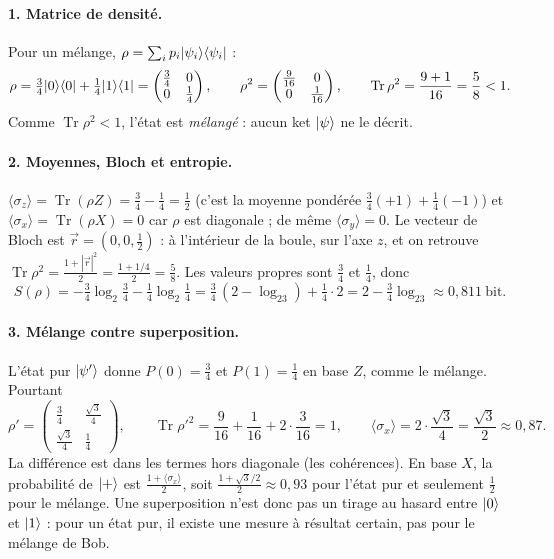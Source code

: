 \begin{correction}
\paragraph{1. Matrice de densité.} Pour un mélange, $\rho=\sum_ip_i|\psi_i\rangle\langle \psi_i|$ :
\[
  \rho=\tfrac34|0\rangle\langle 0|+\tfrac14|1\rangle\langle 1|
  =\begin{pmatrix}\frac34&0\\0&\frac14\end{pmatrix},
  \qquad
  \rho^2=\begin{pmatrix}\frac9{16}&0\\0&\frac1{16}\end{pmatrix},
  \qquad
  \operatorname{Tr}\rho^2=\frac{9+1}{16}=\frac58<1 .
\]
Comme $\operatorname{Tr}\rho^2<1$, l'état est \emph{mélangé} : aucun ket $|\psi\rangle$ ne le décrit.

\paragraph{2. Moyennes, Bloch et entropie.}
$\langle\sigma_z\rangle=\operatorname{Tr}(\rho Z)=\frac34-\frac14=\frac12$ (c'est la moyenne pondérée
$\frac34(+1)+\frac14(-1)$) et $\langle\sigma_x\rangle=\operatorname{Tr}(\rho X)=0$ car $\rho$ est
diagonale ; de même $\langle\sigma_y\rangle=0$. Le vecteur de Bloch est $\vec r=(0,0,\frac12)$ : à
l'intérieur de la boule, sur l'axe $z$, et on retrouve $\operatorname{Tr}\rho^2=\frac{1+|\vec r|^2}{2}
=\frac{1+1/4}{2}=\frac58$. Les valeurs propres sont $\frac34$ et $\frac14$, donc
\[
  S(\rho)=-\tfrac34\log_2\tfrac34-\tfrac14\log_2\tfrac14
  =\tfrac34\,(2-\log_23)+\tfrac14\cdot2=2-\tfrac34\log_23\approx0{,}811\ \text{bit}.
\]

\paragraph{3. Mélange contre superposition.} L'état pur $|\psi'\rangle$ donne
$P(0)=\frac34$ et $P(1)=\frac14$ en base $Z$, comme le mélange. Pourtant
\[
  \rho'=\begin{pmatrix}\frac34&\frac{\sqrt3}{4}\\[0.4ex]\frac{\sqrt3}{4}&\frac14\end{pmatrix},
  \qquad
  \operatorname{Tr}\rho'^2=\frac9{16}+\frac1{16}+2\cdot\frac3{16}=1,
  \qquad
  \langle\sigma_x\rangle=2\cdot\frac{\sqrt3}{4}=\frac{\sqrt3}{2}\approx0{,}87 .
\]
La différence est dans les termes hors diagonale (les cohérences). En base $X$, la probabilité de
$|+\rangle$ est $\frac{1+\langle\sigma_x\rangle}{2}$, soit $\frac{1+\sqrt3/2}{2}\approx0{,}93$ pour
l'état pur et seulement $\frac12$ pour le mélange. Une superposition n'est donc pas un tirage au
hasard entre $|0\rangle$ et $|1\rangle$ : pour un état pur, il existe une mesure à résultat certain, pas
pour le mélange de Bob.


\end{correction}
